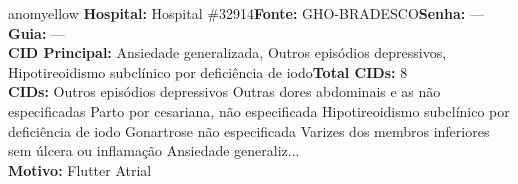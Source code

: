 \documentclass[a4paper,10pt]{article}
\begin{document}
\begin{anomalycard}[Interna\c{c}\~{a}o \#121044 | Pac. \#100319 | MODERADO (z=2.66) | LOS: 13d | 10/03/2026\,$\to$\,—]{anomyellow}
\textbf{Hospital:} Hospital \#32914\quad \textbf{Fonte:} GHO-BRADESCO\quad \textbf{Senha:} ---\quad \textbf{Guia:} ---\\

\textbf{CID Principal:} {\small Ansiedade generalizada, Outros episódios depressivos, Hipotireoidismo subclínico por deficiência de iodo}\quad\textbf{Total CIDs:} 8\\

\textbf{CIDs:} {\scriptsize Outros episódios depressivos \textbar{} Outras dores abdominais e as não especificadas \textbar{} Parto por cesariana, não especificada \textbar{} Hipotireoidismo subclínico por deficiência de iodo \textbar{} Gonartrose não especificada \textbar{} Varizes dos membros inferiores sem úlcera ou inflamação \textbar{} Ansiedade generaliz...}\\

\textbf{Motivo:} {\scriptsize Flutter Atrial}\\




\end{anomalycard}
\end{document}
